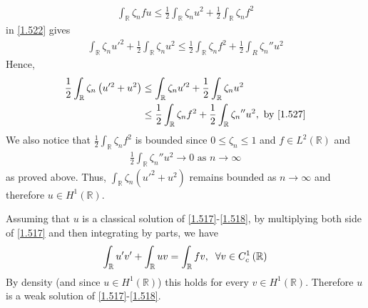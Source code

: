 \documentclass[a4paper,oneside]{article}
\numberwithin{equation}{section}
\begin{document}
\begin{align}
\int_{\mathbb{R}} {{\zeta _n}fu}  \le \frac{1}{2}\int_{\mathbb{R}} {{\zeta _n}{u^2}}  + \frac{1}{2}\int_{\mathbb{R}} {{\zeta _n}{f^2}} 
\end{align}
in \eqref{1.522} gives
\begin{align}
\label{1.527}
\int_{\mathbb{R}} {{\zeta _n}u{'^2}}  + \frac{1}{2}\int_{\mathbb{R}} {{\zeta _n}{u^2}}  \le \frac{1}{2}\int_{\mathbb{R}} {{\zeta _n}{f^2}}  + \frac{1}{2}\int_R {{\zeta _n}''{u^2}} 
\end{align}
Hence,
\begin{align}
\frac{1}{2}\int_{\mathbb{R}} {{\zeta _n}\left( {u{'^2} + {u^2}} \right)}  &\le \int_{\mathbb{R}}  {{\zeta _n}u{'^2}}  + \frac{1}{2}\int_{\mathbb{R}}  {{\zeta _n}{u^2}} \\
 &\le \frac{1}{2}\int_{\mathbb{R}}  {{\zeta _n}{f^2}}  + \frac{1}{2}\int_{\mathbb{R}}  {{\zeta _n}''{u^2}},\mbox{ by \eqref{1.527}}
\end{align}
We also notice that $\frac{1}{2}\int_{\mathbb{R}}  {{\zeta _n}{f^2}} $ is bounded since $0\le \zeta _n\le 1$ and $f\in L^2\left(\mathbb{R}\right)$ and 
\begin{align}
\frac{1}{2}\int_{\mathbb{R}} {{\zeta _n}''{u^2}}  \to 0\mbox{ as } n \to \infty 
\end{align}
as proved above. Thus, $\int_{\mathbb{R}} {{\zeta _n}\left( {u{'^2} + {u^2}} \right)} $ remains bounded as $n\to \infty$ and therefore $u\in H^1\left(\mathbb{R}\right)$. 

Assuming that $u$ is a classical solution of \eqref{1.517}-\eqref{1.518}, by multiplying both side of \eqref{1.517} and then integrating by parts, we have
\begin{align}
\int_{\mathbb{R}} {u'v'}  + \int_{\mathbb{R}} {uv}  = \int_{\mathbb{R}} {fv} ,\hspace{0.2cm}\forall v \in C_c^1\left( \mathbb{R} \right)
\end{align}
By density (and since $u\in H^1\left(\mathbb{R}\right)$) this holds for every $v\in H^1\left(\mathbb{R}\right)$. Therefore $u$ is a weak solution of \eqref{1.517}-\eqref{1.518}. 
\end{document}
